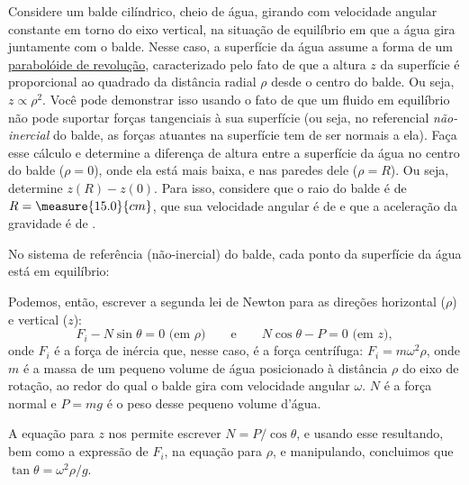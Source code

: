 \begin{question}
    Considere um balde cilíndrico, cheio de água, girando com velocidade angular constante em torno do eixo vertical, na situação de equilíbrio em que a água gira juntamente com o balde.
    Nesse caso, a superfície da água assume a forma de um \href{https://en.wikipedia.org/wiki/Paraboloid}{parabolóide de revolução}, caracterizado pelo fato de que a altura $z$ da superfície é proporcional ao quadrado da distância radial $\rho$ desde o centro do balde.
    Ou seja, $z \propto \rho^2$.
    Você pode demonstrar isso usando o fato de que um fluido em equilíbrio não pode suportar forças tangenciais à sua superfície (ou seja, no referencial \emph{não-inercial} do balde, as forças atuantes na superfície tem de ser normais a ela).
    Faça esse cálculo e determine a diferença de altura entre a superfície da água no centro do balde ($\rho = 0$), onde ela está mais baixa, e nas paredes dele ($\rho = R$).
    Ou seja, determine $z(R) - z(0)$.
    Para isso, considere que o raio do balde é de $R = \measure{15.0}{cm}$, que sua velocidade angular é de  e que a aceleração da gravidade é de .
  
    \begin{answer}
    \end{answer}

    \begin{solution}
      No sistema de referência (não-inercial) do balde, cada ponto da superfície da água está em equilíbrio:


      Podemos, então, escrever a segunda lei de Newton para as direções horizontal ($\rho$) e vertical ($z$):
      \begin{equation*}
        F_i - N \sin\theta = 0
        \text{ (em $\rho$)}
        \qquad\text{e}\qquad
        N \cos\theta - P = 0
        \text{ (em $z$)},
      \end{equation*}
      onde $F_i$ é a força de inércia que, nesse caso, é a força centrífuga: $F_i = m \omega^2 \rho$, onde $m$ é a massa de um pequeno volume de água posicionado à distância $\rho$ do eixo de rotação, ao redor do qual o balde gira com velocidade angular $\omega$.
      $N$ é a força normal e $P = mg$ é o peso desse pequeno volume d'água.

      A equação para $z$ nos permite escrever $N = P/\cos\theta$, e usando esse resultando, bem como a expressão de $F_i$, na equação para $\rho$, e manipulando, concluimos que $\tan\theta = \omega^2\rho/g$.


\end{solution}
\end{question}
